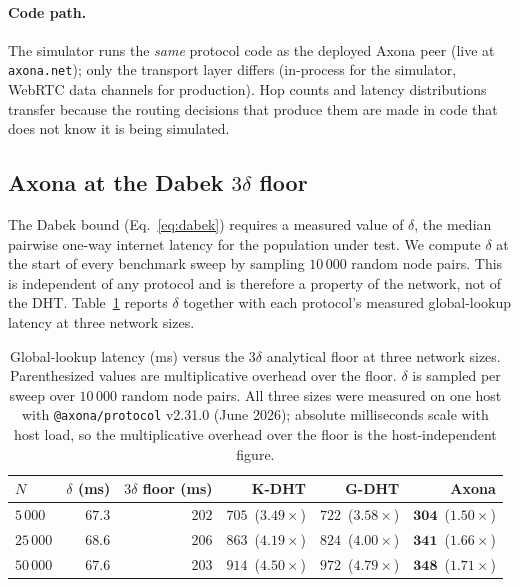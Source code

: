 \documentclass[conference]{IEEEtran}
\newcommand{\axona}{Axona\xspace}
\newcommand{\KDHT}{K-DHT\xspace}
\newcommand{\GDHT}{G-DHT\xspace}
\begin{document}
\paragraph{Code path.}
The simulator runs the \emph{same} protocol code as the
deployed \axona peer (live at \texttt{axona.net}); only the
transport layer differs (in-process for the simulator, WebRTC
data channels for production).  Hop counts and latency
distributions transfer because the routing decisions that
produce them are made in code that does not know it is being
simulated.

\subsection{\axona at the Dabek $3\delta$ floor}
\label{sec:eval-floor}

The Dabek bound (Eq.~\ref{eq:dabek}) requires a measured value
of $\delta$, the median pairwise one-way internet latency for
the population under test.  We compute $\delta$ at the start of
every benchmark sweep by sampling $10\,000$ random node pairs.
This is independent of any protocol and is therefore a property
of the network, not of the DHT.  Table~\ref{tab:floor} reports
$\delta$ together with each protocol's measured global-lookup
latency at three network sizes.

\begin{table}[t]
\centering
\caption{Global-lookup latency (ms) versus the $3\delta$
analytical floor at three network sizes.  Parenthesized values
are multiplicative overhead over the floor.  $\delta$ is
sampled per sweep over $10\,000$ random node pairs.  All three
sizes were measured on one host with \texttt{@axona/protocol}
v2.31.0 (June 2026); absolute milliseconds scale with host load,
so the multiplicative overhead over the floor is the
host-independent figure.}
\label{tab:floor}
\small
\begin{tabular}{@{}lrrrrr@{}}
\toprule
$N$ & $\delta$ (ms) & $3\delta$ floor (ms) & \KDHT & \GDHT & \textbf{\axona} \\
\midrule
$5\,000$  & $67.3$ & $202$ & $705$\ ($3.49\times$) & $722$\ ($3.58\times$) & $\mathbf{304}$\ ($\mathbf{1.50\times}$) \\
$25\,000$ & $68.6$ & $206$ & $863$\ ($4.19\times$) & $824$\ ($4.00\times$) & $\mathbf{341}$\ ($\mathbf{1.66\times}$) \\
$50\,000$ & $67.6$ & $203$ & $914$\ ($4.50\times$) & $972$\ ($4.79\times$) & $\mathbf{348}$\ ($\mathbf{1.71\times}$) \\
\bottomrule
\end{tabular}
\end{table}
\end{document}
